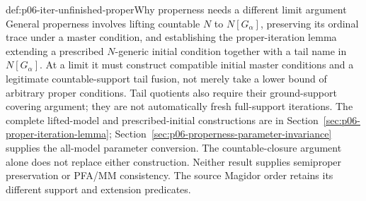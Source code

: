 \begin{proofboundary}{def:p06-iter-unfinished-proper}{Why properness needs a different limit argument}
General properness involves lifting countable \(N\) to \(N[G_\alpha]\),
preserving its ordinal trace under a master condition, and establishing the
proper-iteration lemma extending a prescribed \(N\)-generic initial
condition together with a tail name in \(N[G_\alpha]\). At a limit it
must construct compatible initial master conditions and a legitimate
countable-support tail fusion, not merely take a lower bound of arbitrary
proper conditions. Tail quotients also require their ground-support
covering argument; they are not automatically fresh full-support iterations.
The complete lifted-model and prescribed-initial constructions are in
Section~\ref{sec:p06-proper-iteration-lemma};
Section~\ref{sec:p06-properness-parameter-invariance} supplies the
all-model parameter conversion. The countable-closure argument alone
does not replace either construction. Neither result supplies semiproper
preservation or PFA/MM consistency. The source Magidor order retains its
different support and extension predicates.
\end{proofboundary}
